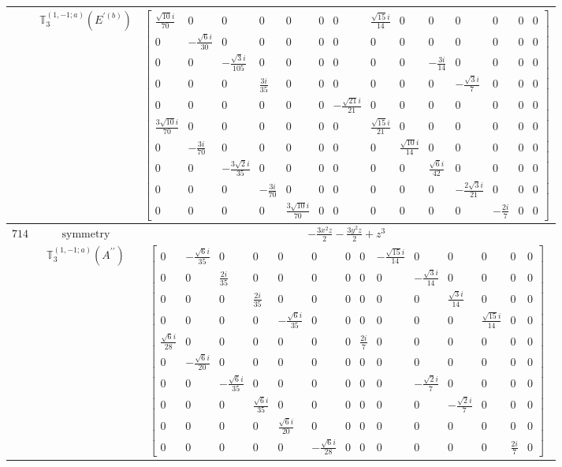 \documentclass[fleqn,8pt,landscape]{jsarticle}
\begin{document}
\begin{longtable}{ccc}
$  $ & $ \mathbb{T}_{3}^{(1,-1;a)}(E^{\prime(b)}) $ & $ \begin{bmatrix} \frac{\sqrt{10} i}{70} & 0 & 0 & 0 & 0 & 0 & 0 & \frac{\sqrt{15} i}{14} & 0 & 0 & 0 & 0 & 0 & 0 \\ 0 & - \frac{\sqrt{6} i}{30} & 0 & 0 & 0 & 0 & 0 & 0 & 0 & 0 & 0 & 0 & 0 & 0 \\ 0 & 0 & - \frac{\sqrt{3} i}{105} & 0 & 0 & 0 & 0 & 0 & 0 & - \frac{3 i}{14} & 0 & 0 & 0 & 0 \\ 0 & 0 & 0 & \frac{3 i}{35} & 0 & 0 & 0 & 0 & 0 & 0 & - \frac{\sqrt{3} i}{7} & 0 & 0 & 0 \\ 0 & 0 & 0 & 0 & 0 & 0 & - \frac{\sqrt{21} i}{21} & 0 & 0 & 0 & 0 & 0 & 0 & 0 \\ \frac{3 \sqrt{10} i}{70} & 0 & 0 & 0 & 0 & 0 & 0 & \frac{\sqrt{15} i}{21} & 0 & 0 & 0 & 0 & 0 & 0 \\ 0 & - \frac{3 i}{70} & 0 & 0 & 0 & 0 & 0 & 0 & \frac{\sqrt{10} i}{14} & 0 & 0 & 0 & 0 & 0 \\ 0 & 0 & - \frac{3 \sqrt{2} i}{35} & 0 & 0 & 0 & 0 & 0 & 0 & \frac{\sqrt{6} i}{42} & 0 & 0 & 0 & 0 \\ 0 & 0 & 0 & - \frac{3 i}{70} & 0 & 0 & 0 & 0 & 0 & 0 & - \frac{2 \sqrt{3} i}{21} & 0 & 0 & 0 \\ 0 & 0 & 0 & 0 & \frac{3 \sqrt{10} i}{70} & 0 & 0 & 0 & 0 & 0 & 0 & - \frac{2 i}{7} & 0 & 0 \end{bmatrix} $ \\ \hline
$ 714 $ & $ \text{symmetry} $ & $ - \frac{3 x^{2} z}{2} - \frac{3 y^{2} z}{2} + z^{3} $ \\
$  $ & $ \mathbb{T}_{3}^{(1,-1;a)}(A^{\prime\prime}) $ & $ \begin{bmatrix} 0 & - \frac{\sqrt{6} i}{35} & 0 & 0 & 0 & 0 & 0 & 0 & - \frac{\sqrt{15} i}{14} & 0 & 0 & 0 & 0 & 0 \\ 0 & 0 & \frac{2 i}{35} & 0 & 0 & 0 & 0 & 0 & 0 & - \frac{\sqrt{3} i}{14} & 0 & 0 & 0 & 0 \\ 0 & 0 & 0 & \frac{2 i}{35} & 0 & 0 & 0 & 0 & 0 & 0 & \frac{\sqrt{3} i}{14} & 0 & 0 & 0 \\ 0 & 0 & 0 & 0 & - \frac{\sqrt{6} i}{35} & 0 & 0 & 0 & 0 & 0 & 0 & \frac{\sqrt{15} i}{14} & 0 & 0 \\ \frac{\sqrt{6} i}{28} & 0 & 0 & 0 & 0 & 0 & 0 & \frac{2 i}{7} & 0 & 0 & 0 & 0 & 0 & 0 \\ 0 & - \frac{\sqrt{6} i}{20} & 0 & 0 & 0 & 0 & 0 & 0 & 0 & 0 & 0 & 0 & 0 & 0 \\ 0 & 0 & - \frac{\sqrt{6} i}{35} & 0 & 0 & 0 & 0 & 0 & 0 & - \frac{\sqrt{2} i}{7} & 0 & 0 & 0 & 0 \\ 0 & 0 & 0 & \frac{\sqrt{6} i}{35} & 0 & 0 & 0 & 0 & 0 & 0 & - \frac{\sqrt{2} i}{7} & 0 & 0 & 0 \\ 0 & 0 & 0 & 0 & \frac{\sqrt{6} i}{20} & 0 & 0 & 0 & 0 & 0 & 0 & 0 & 0 & 0 \\ 0 & 0 & 0 & 0 & 0 & - \frac{\sqrt{6} i}{28} & 0 & 0 & 0 & 0 & 0 & 0 & \frac{2 i}{7} & 0 \end{bmatrix} $ \\ \hline

\end{longtable}
\end{document}
